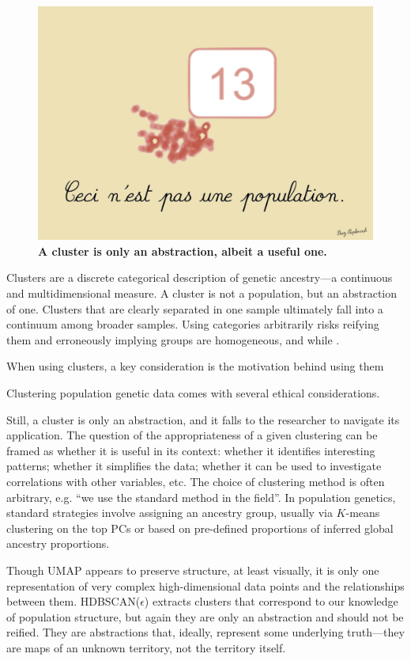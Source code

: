 \begin{figure}[h]
\centering
    \includegraphics[width=0.75\linewidth]{main_figures/discussion/magritte.png}
\caption[The treachery of clustering]{\textbf{A cluster is only an abstraction, albeit a useful one.}}
\label{fig:magritte}
\end{figure}

Clusters are a discrete categorical description of genetic ancestry---a continuous and multidimensional measure. A cluster is not a population, but an abstraction of one. Clusters that are clearly separated in one sample ultimately fall into a continuum among broader samples. Using categories arbitrarily risks reifying them and erroneously implying groups are homogeneous, and while \citep{lewis_getting_2022}. 

When using clusters, a key consideration is the motivation behind using them

Clustering population genetic data comes with several ethical considerations.

Still, a cluster is only an abstraction, and it falls to the researcher to navigate its application. The question of the appropriateness of a given clustering can be framed as whether it is useful in its context: whether it identifies interesting patterns; whether it simplifies the data; whether it can be used to investigate correlations with other variables, etc\citep{hennig_what_2015}. The choice of clustering method is often arbitrary, e.g. ``we use the standard method in the field''\citep{ben-david_clustering_2018}. In population genetics, standard strategies involve assigning an ancestry group, usually via $K$-means clustering on the top PCs or based on pre-defined proportions of inferred global ancestry proportions. 

Though UMAP appears to preserve structure, at least visually, it is only one representation of very complex high-dimensional data points and the relationships between them. HDBSCAN($\hat{\epsilon}$) extracts clusters that correspond to our knowledge of population structure, but again they are only an abstraction and should not be reified. They are abstractions that, ideally, represent some underlying truth---they are maps of an unknown territory, not the territory itself.

